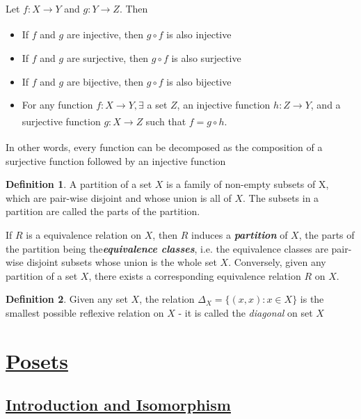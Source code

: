 \documentclass{article}
\theoremstyle{definition}
\newtheorem*{defi}{Definition}
\theoremstyle{definition}
\newenvironment{manualprop}[1]{%
  \renewcommand\themanualpropinner{#1}%
  \manualpropinner
}{\endmanualpropinner}
\theoremstyle{named}
\begin{document}
\begin{manualprop}{2}
Let $f: X \xrightarrow[]{} Y$ and $g: Y \xrightarrow[]{} Z$. Then
\begin{itemize}
    \item If $f$ and $g$ are injective, then $g \circ f$ is also injective
    \item If $f$ and $g$ are surjective, then $g \circ f$ is also surjective
    \item If $f$ and $g$ are bijective, then $g \circ f$ is also bijective
    \item For any function $f: X \xrightarrow[]{} Y, \exists$ a set $Z$, an injective function $h: Z \xrightarrow[]{} Y$, and a surjective function $g:X \xrightarrow[]{} Z$ such that $f = g \circ h$.
\end{itemize}
In other words, every function can be decomposed as the composition of a surjective function followed by an injective function
\end{manualprop}

\begin{defi}
A partition of a set $X$ is a family of non-empty subsets of X, which are pair-wise disjoint and whose union is all of $X$. The subsets in a partition are called the parts of the partition.
\end{defi}

\begin{manualprop}{3}
If $R$ is a equivalence relation on $X$, then $R$ induces a \textbf{\emph{partition}} of $X$, the parts of the partition being the\textbf{\emph{equivalence classes}}, i.e. the equivalence classes are pair-wise disjoint subsets whose union is the whole set $X$. Conversely, given any partition of a set $X$, there exists a corresponding equivalence relation $R$ on $X$.
\end{manualprop}

\begin{defi}
Given any set $X$, the relation $\Delta_{X} = \{(x, x): x \in X\}$ is the smallest possible reflexive relation on $X$ - it is called the \emph{diagonal} on set $X$
\end{defi}

\section{\underline{Posets}}
\subsection{\underline{Introduction and Isomorphism}}
\end{document}
